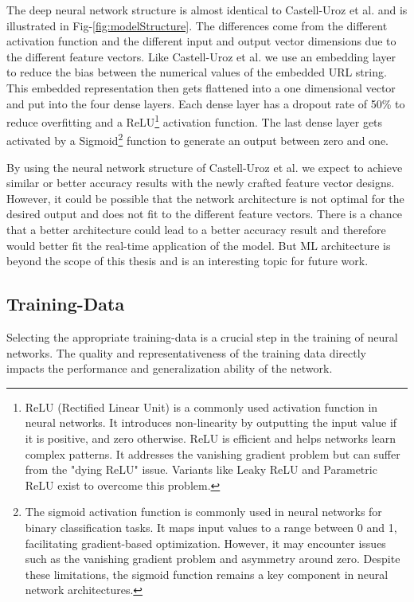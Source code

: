 The deep neural network structure is almost identical to Castell-Uroz et al. \cite{castell2020url} and is illustrated in Fig-\ref{fig:modelStructure}.
The differences come from the different activation
function and the different input and output vector dimensions due to the different feature vectors. Like Castell-Uroz et al. we use an embedding layer to reduce the bias between the numerical values of the embedded URL string. This embedded 
representation then gets flattened into a one dimensional vector and put into the four dense layers. Each dense layer has a dropout rate of 50\% to reduce
overfitting and a ReLU\footnote{ReLU (Rectified Linear Unit) is a commonly used activation function in neural networks. It 
introduces non-linearity by outputting the input value if it is positive, and zero otherwise. ReLU is efficient and helps
networks learn complex patterns. It addresses the vanishing gradient problem but can suffer from the "dying ReLU" issue. Variants
like Leaky ReLU and Parametric ReLU exist to overcome this problem.} activation function. The last dense layer gets activated
by a Sigmoid\footnote{The sigmoid activation function is commonly used in neural networks for binary classification tasks. It maps input values to a range between 0 and 1, facilitating gradient-based optimization. However, it may encounter issues such as the vanishing gradient problem and asymmetry around zero. Despite these limitations, the sigmoid function remains a key component in neural network architectures.} function to generate an output
between zero and one.

By using the neural network structure of Castell-Uroz et al. we expect to achieve similar or better accuracy results with 
the newly crafted feature vector designs. However, it could be possible that the network architecture is not optimal
for the desired output and does not fit to the different feature vectors. There is a chance that a better architecture could 
lead to a better accuracy result and therefore would better fit the real-time application of the model. But ML architecture is beyond
the scope of this thesis and is an interesting topic for future work.

\subsection{Training-Data}

Selecting the appropriate training-data is a crucial step in the training of neural networks. The quality and representativeness 
of the training data directly impacts the performance and generalization ability of the network.

